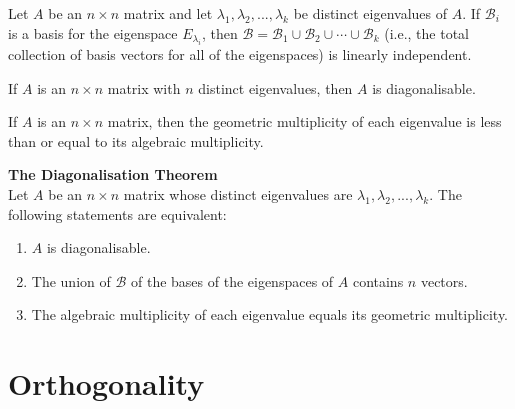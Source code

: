\documentclass{article}
\begin{document}
\begin{theorem}
	Let $A$ be an $n\times n$ matrix and let $\lambda_1, \lambda_2, ..., \lambda_k$ be distinct eigenvalues of $A$. If $\mathcal{B}_i$ is a basis for the eigenspace $E_{\lambda_i}$, then $\mathcal{B} = \mathcal{B}_1\cup\mathcal{B}_2\cup\cdots\cup\mathcal{B}_k$ (i.e., the total collection of basis vectors for all of the eigenspaces) is linearly independent.
\end{theorem}
\begin{theorem}
	If $A$ is an $n\times n$ matrix with $n$ distinct eigenvalues, then $A$ is diagonalisable.
\end{theorem}
\begin{theorem}
	If $A$ is an $n\times n$ matrix, then the geometric multiplicity of each eigenvalue is less than or equal to its algebraic multiplicity.
\end{theorem}
\begin{theorem}
	\textbf{The Diagonalisation Theorem}\\
	Let $A$ be an $n\times n$ matrix whose distinct eigenvalues are $\lambda_1, \lambda_2, ...,\lambda_k$. The following statements are equivalent:
	\begin{enumerate}
		\item $A$ is diagonalisable.
		\item The union of $\mathcal{B}$ of the bases of the eigenspaces of $A$ contains $n$ vectors.
		\item The algebraic multiplicity of each eigenvalue equals its geometric multiplicity.
	\end{enumerate}

\end{theorem}
\section{Orthogonality}
\end{document}
